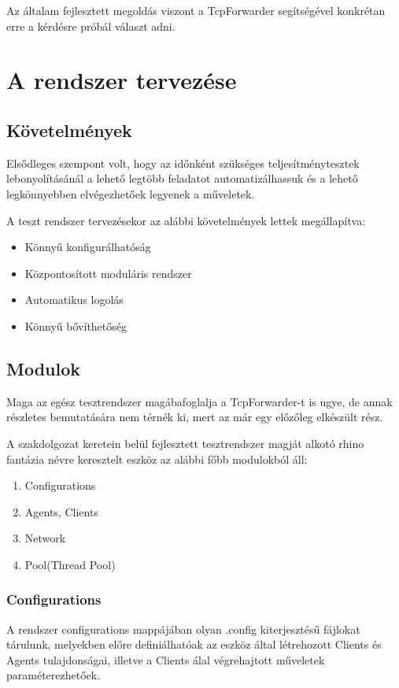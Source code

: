 \documentclass[a4paper,12pt,oneside]{report}
\begin{document}
Az általam fejlesztett megoldás viszont a TcpForwarder segítségével konkrétan erre a kérdésre próbál választ adni.

\section{A rendszer tervezése}
\subsection{Követelmények}
Elsődleges szempont volt, hogy az időnként szükséges teljesítménytesztek lebonyolításánál a lehető legtöbb feladatot automatizálhassuk és a lehető legkönnyebben elvégezhetőek legyenek a műveletek.

A teszt rendszer tervezésekor az alábbi követelmények lettek megállapítva:
\begin{itemize}
	\itemsep0em
		\item Könnyű konfigurálhatóság
		\item Központosított moduláris rendszer
		\item Automatikus logolás
		\item Könnyű bővíthetőség
\end{itemize}

\subsection{Modulok}
Maga az egész tesztrendszer magábafoglalja a TcpForwarder-t is ugye, de annak részletes bemutatására nem térnék ki, mert az már egy előzőleg elkészült rész.

A szakdolgozat keretein belül fejlesztett tesztrendszer magját alkotó rhino fantázia névre keresztelt eszköz az alábbi főbb modulokból áll:

\begin{enumerate}
	\itemsep0em
		\item Configurations
		\item Agents, Clients
		\item Network
		\item Pool(Thread Pool)
\end{enumerate}

\subsubsection{Configurations}

A rendszer configurations mappájában olyan .config kiterjesztésű fájlokat tárulunk, melyekben előre definiálhatóak az eszköz által létrehozott Clients és Agents tulajdonságai, illetve a Clients álal végrehajtott műveletek paraméterezhetőek.
\end{document}
